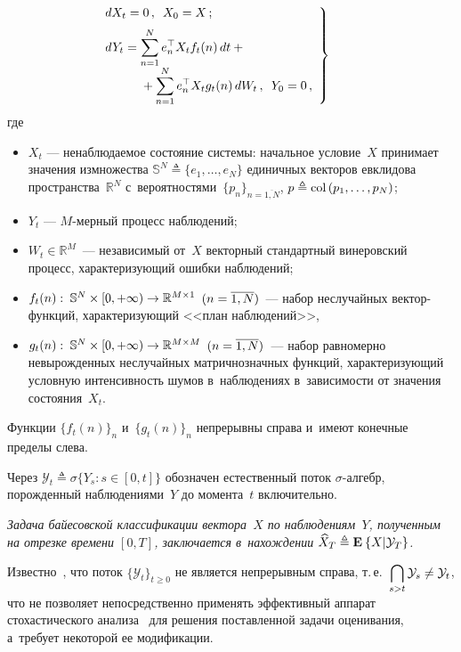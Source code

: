 \begin{multicols}{2}
  \noindent
  \begin{equation}
\left.
\begin{array}{l}
\hspace*{-10mm}\displaystyle dX_t = 0\,, \enskip X_0 = X\,;\\[6pt]
\hspace*{-10mm}\displaystyle dY_t = \sum\limits_{n=1}^Ne_n^{\top}X_t f_t(n)\,dt + {}\\[6pt] 
\displaystyle{}+\sum\limits_{n=1}^Ne_n^{\top}X_tg_t(n)\,dW_t\,, \enskip
Y_0=0\,,
\end{array}
\right\}
\label{eq:obsys_1}
\end{equation}
где
  \begin{itemize}
  \item $X_t$ --- ненаблюдаемое состояние системы: начальное условие~$X$ 
  принимает значения из\linebreak множества $\mathbb{S}^N \triangleq \{e_1,\ldots,e_N\}$ 
  единичных векторов евклидова пространства~$\mathbb{R}^N$ 
  с~вероятностями~$\{p_n\}_{n=\overline{1,N}}$, $p\triangleq \mathop{\mathrm{col}}\,(p_1,\ldots,p_N)$;
  \item $Y_t$ --- $M$-мер\-ный процесс наблюдений;
  \item $W_t \in \mathbb{R}^M$~--- независимый от~$X$ векторный 
  стандартный винеровский процесс, характери\-зу\-ющий ошибки наблюдений;
  \item $f_t(n):\;\mathbb{S}^N \times [0,+\infty) \hm\to \mathbb{R}^{M \times 1}$ 
  $(n\hm=\overline{1,N})$~--- набор неслучайных  
  век\-тор-функ\-ций, характеризующий <<план наблюдений>>,
  \item
  $g_t(n):\;\mathbb{S}^N \times [0,+\infty)\hm \to \mathbb{R}^{M \times M}$ 
  $(n\hm=\overline{1,N})$~--- набор равномерно невырожденных неслучайных 
 матричнозначных функций,
характеризующий условную интенсивность шумов в~наблюдениях в~зависимости от 
значения состояния~$X_t$.
  \end{itemize}
  Функции $\{f_t(n)\}_n$ и~$\{g_t(n)\}_n$ непрерывны справа и~имеют конечные пределы слева.

  Через $\mathcal{Y}_t \triangleq \sigma \{Y_s: s \in [0,t] \}$ 
  обозначен естественный поток $\sigma$-ал\-гебр, порожденный наблюдениями~$Y$ 
  до момента~$t$ включительно.

  \textit{Задача байесовской классификации вектора~$X$ по наблюдениям~$Y$, 
  полученным на отрезке времени $[0,T]$, заключается в~нахождении 
  $\widehat{X}_T \triangleq \mathbf{E}_{  }\left\{ \mathop{X|\mathcal{Y}_T} \right\}$.}

  Известно~\cite{S_14}, что поток $\{\mathcal{Y}_t\}_{t \geqslant 0}$ 
  не является непрерывным справа, т.\,е.\ 
  $\displaystyle \bigcap_{s > t}\mathcal{Y}_s \hm\neq \mathcal{Y}_t$, 
  что не позволяет непосредственно применять эффективный аппарат 
  стохастического анализа~\cite{LS_86} для решения поставленной задачи оценивания, 
  а~требует некоторой ее модификации.


\end{multicols}
